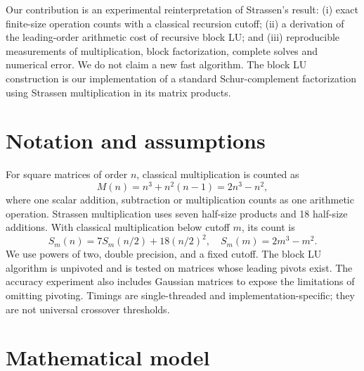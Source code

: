 \documentclass[9pt,a4paper]{article}
\begin{document}
Our contribution is an experimental reinterpretation of Strassen's result: (i) exact finite-size operation counts with a classical recursion cutoff; (ii) a derivation of the leading-order arithmetic cost of recursive block LU; and (iii) reproducible measurements of multiplication, block factorization, complete solves and numerical error. We do not claim a new fast algorithm. The block LU construction is our implementation of a standard Schur-complement factorization using Strassen multiplication in its matrix products.

\section{Notation and assumptions}
For square matrices of order $n$, classical multiplication is counted as
\[
M(n)=n^3+n^2(n-1)=2n^3-n^2,
\]
where one scalar addition, subtraction or multiplication counts as one arithmetic operation. Strassen multiplication uses seven half-size products and 18 half-size additions. With classical multiplication below cutoff $m$, its count is
\begin{equation}
S_m(n)=7S_m(n/2)+18(n/2)^2,\quad S_m(m)=2m^3-m^2.
\tag{1}
\end{equation}
We use powers of two, double precision, and a fixed cutoff. The block LU algorithm is unpivoted and is tested on matrices whose leading pivots exist. The accuracy experiment also includes Gaussian matrices to expose the limitations of omitting pivoting. Timings are single-threaded and implementation-specific; they are not universal crossover thresholds.

\section{Mathematical model}
\end{document}
